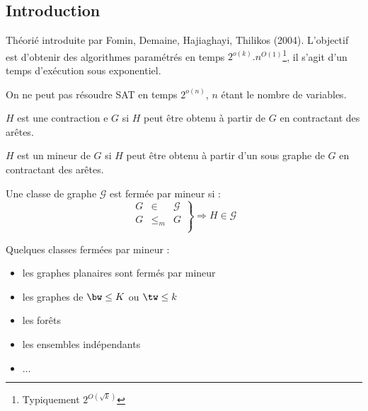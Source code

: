 \documentclass[a4paper, 11pt]{thesis}
\begin{document}
\subsection{Introduction}

Théorié introduite par Fomin, Demaine, Hajiaghayi, Thilikos (2004).
L'objectif est d'obtenir des algorithmes paramétrés en temps
$2^{o(k)}.n^{O(1)}$\footnote{Typiquement $2^{O(\sqrt{k})}$}, il s'agit d'un
temps d'exécution sous exponentiel.

\begin{conj}
    On ne peut pas résoudre SAT en temps $2^{o(n)}$, $n$ étant le nombre de variables.
\end{conj}

\begin{rappel}
\end{rappel}

\begin{df}[$H \leq_c G$]
    $H$ est une contraction e $G$ si $H$ peut être obtenu à partir de $G$ en contractant des arêtes.
\end{df}

\begin{df}[$H \leq_m G$]
    $H$ est un mineur de $G$ si $H$ peut être obtenu à partir d'un sous graphe de $G$ en contractant
    des arêtes.
\end{df}

\begin{df}
    Une classe de graphe $\mathcal{G}$ est fermée par mineur si : \begin{displaymath}
        \left . \begin{array}{rcl}
            G & \in & \mathcal{G} \\
            G & \leq_m & G \\
        \end{array} \right \rbrace \Rightarrow H \in \mathcal{G}
    \end{displaymath}
\end{df}

Quelques classes fermées par mineur :
\begin{itemize}
    \item les graphes planaires sont fermés par mineur
    \item les graphes de $\bw \leq K$ ou $\tw \leq k$
    \item les forêts
    \item les ensembles indépendants 
    \item $\dots$
\end{itemize}
\end{document}
